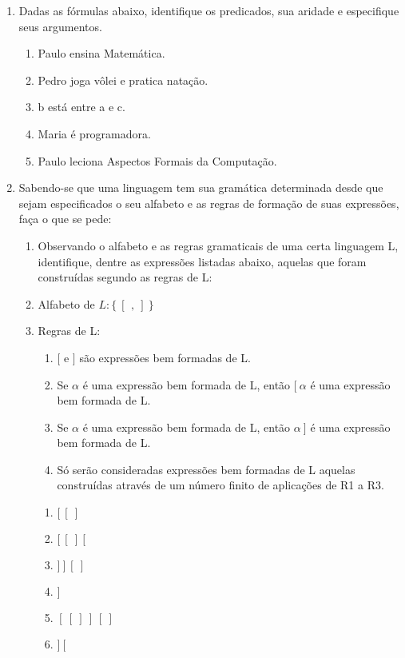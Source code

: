 \begin{enumerate}[label=\arabic*)]
    \item Dadas as fórmulas abaixo, identifique os predicados, sua aridade e especifique seus argumentos.
    \begin{enumerate}[label=\alph*)]
        \item Paulo ensina Matemática.
        \item Pedro joga vôlei e pratica natação.
        \item b está entre a e c.
        \item Maria é programadora.
        \item Paulo leciona Aspectos Formais da Computação.
    \end{enumerate}

    \item Sabendo-se que uma linguagem tem sua gramática determinada desde que sejam especificados o seu alfabeto e as regras de formação de suas expressões, faça o que se pede:
    \begin{enumerate}[label=\alph*)]
        \item Observando o alfabeto e as regras gramaticais de uma certa linguagem L, identifique, dentre as expressões listadas abaixo, aquelas que foram construídas segundo as regras de L:

        \item[] Alfabeto de $L \colon \{\ [\ \, ,\ ]\ \}$
        \item[] Regras de L:
        \begin{enumerate}[label=R{\arabic*.}]
            \item $[$ e $]$ são expressões bem formadas de L.
            \item Se $\alpha$ é uma expressão bem formada de L, então $[\ \alpha$ é uma expressão bem formada de L.
            \item Se $\alpha$ é uma expressão bem formada de L, então $\alpha\ ]$ é uma expressão bem formada de L.
            \item Só serão consideradas expressões bem formadas de L aquelas construídas através de um número finito de aplicações de R1 a R3.
        \end{enumerate}

        \begin{multicols}{2}
            \begin{enumerate}[label=(\alph*)]
                \item $[\ [\ ]$
                \item $[\ [\ ]\ [$
                \item $]\ ]\ [\ ]$
                \item $]$
                \item $[\ [\ ]\ ]\ [\ ]$
                \item $]\ [$
            \end{enumerate}
        \end{multicols}


\end{enumerate}
\end{enumerate}
